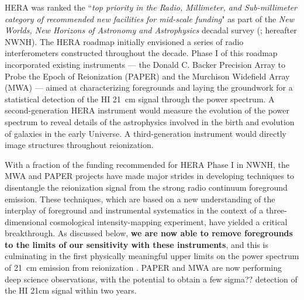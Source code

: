 \documentclass[preprint]{aastex}
\begin{document}
HERA was ranked the ``{\it top priority in the Radio, Millimeter, and
Sub-millimeter category of recommended new facilities for mid-scale
funding}" as part of the {\it New Worlds, New Horizons of Astronomy
and Astrophysics} decadal survey (\citealt{astro2010}; hereafter
NWNH).  The HERA roadmap initially envisioned a series of radio
interferometers constructed throughout the decade. Phase I of this roadmap
incorporated existing instruments --- the Donald C. Backer Precision Array to Probe the Epoch of
Reionization (PAPER) and the Murchison Widefield Array (MWA) ---
aimed at characterizing foregrounds and laying the
groundwork for a statistical detection of the HI 21~cm signal through
the power spectrum.  A second-generation HERA instrument would measure
the evolution of the power spectrum to reveal details of the astrophysics
involved in the birth and evolution of galaxies 
in the early Universe. A third-generation instrument would
directly image structures throughout reionization.

With a fraction of the funding recommended for HERA Phase I
in NWNH, the MWA and PAPER projects have made
major strides in developing techniques to disentangle
the reionization signal from the strong radio continuum foreground
emission.  These techniques, which are based on a new
understanding of the interplay of foreground and instrumental systematics
in the context of a three-dimensional cosmological intensity-mapping experiment,
have yielded a critical breakthrough.  As discussed below, {\bf we are now able to remove 
foregrounds to the limits of our sensitivity with these instruments},
and this is culminating in the first physically meaningful upper limits
on the power spectrum of 21~cm emission from reionization \citep{parsons_et_al2013}. PAPER
and MWA are now performing deep science observations, with the potential to 
obtain a few sigma?? detection of the HI 21cm signal within two years. 


\end{document}
